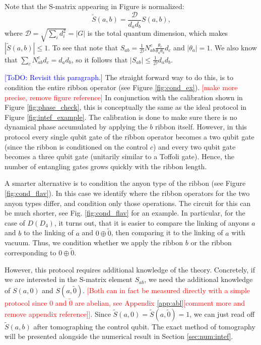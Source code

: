 \documentclass[two column]{article}
\newcommand{\caro}[1]{\textcolor{red}{[#1]}}
\newcommand{\jovan}[1]{\textcolor{blue}{[#1]}}
\begin{document}
Note that the S-matrix appearing in Figure is normalized:
\begin{equation}
    \tilde{S}(a,b) = \frac{\mathcal D}{d_a d_b}S(a,b),
\end{equation}
where $\mathcal D=\sqrt{\sum_i d_i^2}=|G|$ is the total quantum dimension,
which makes $|\tilde{S}(a,b)| \leq 1$. To see that note that $S_{ab}=\frac{1}{\mathcal D} N_{ab}^c \frac{\theta_c}{\theta_a \theta_b} d_c$ and $|\theta_a|=1$. We also know that $\sum_c N_{ab}^c d_c = d_a d_b$, so it follows that $|S_{ab}| \leq \frac{1}{\mathcal D} d_a d_b$.


\jovan{ToDO: Revisit this paragraph.}
The straight forward way to do this, is to condition the entire ribbon operator (see Figure \ref{fig:cond_ex}).  \caro{make more precise, remove figure reference} In conjunction with the calibration shown in Figure \ref{fig:phase_check}, this is conceptually the same as the ideal protocol in Figure \ref{fig:intef_example}. 
The calibration is done to make sure there is no dynamical phase accumulated by applying the $b$ ribbon itself.
However, in this protocol every single qubit gate of the ribbon operator becomes a two qubit gate (since the ribbon is conditioned on the control $c$) and every two qubit gate becomes a three qubit gate (unitarily similar to a Toffoli gate). Hence, the number of entangling gates grows quickly with the ribbon length.

A smarter alternative is to condition the anyon type of the ribbon (see Figure \ref{fig:cond_flav}). In this case we identify where the ribbon operators for the two anyon types differ, and condition only those operations. The circuit for this can be much shorter, see Fig. \ref{fig:cond_flav} for an example. In particular, for the case of $D(D_4)$, it turns out, that it is easier to compare the linking of anyons $a$ and $b$ to the linking of $a$ and $0 \oplus \tilde 0$, then comparing it to the linking of $a$ with vacuum. Thus, we condition whether we apply the ribbon $b$ or the ribbon corresponding to $0 \oplus \tilde 0$. 

However, this protocol requires additional knowledge of the theory. Concretely, if we are interested in the S-matrix element $S_{ab}$, we need the additional knowledge of  $S(a, 0)$ and $S(a, \tilde{0})$. \caro{Both can in fact be measured directly with a simple protocol since $0$ and $\tilde{0}$ are abelian, see Appendix \ref{app:abl}[comment more and remove appendix reference]}.
Since $\tilde S(a, 0) = \tilde S(a, \tilde{0}) = 1$, we can just read off $\tilde S(a,b)$ after tomographing the control qubit.
The exact method of tomography will be presented alongside the numerical result in Section \ref{sec:num:intef}. 
\end{document}
